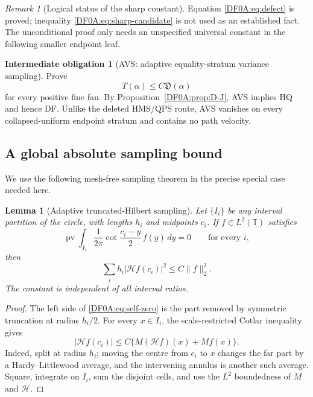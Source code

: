 \documentclass[11pt]{amsart}
\numberwithin{equation}{section}
\newtheorem{lemma}[theorem]{Lemma}
\theoremstyle{definition}
\newtheorem{obligation}[theorem]{Intermediate obligation}
\theoremstyle{remark}
\newtheorem{remark}[theorem]{Remark}
\newcommand{\T}{\mathbb T}
\newcommand{\Hil}{\mathcal H}
\begin{document}
\begin{remark}[Logical status of the sharp constant]
Equation \eqref{DF0A:eq:defect} is proved; inequality
\eqref{DF0A:eq:sharp-candidate} is not used as an established fact.  The
unconditional proof only needs an unspecified universal constant in the
following smaller endpoint leaf.
\end{remark}

\begin{obligation}[AVS: adaptive equality-stratum variance sampling]
\label{DF0A:obl:AVS}
Prove
\begin{equation}\label{DF0A:eq:AVS}
 \boxed{T(\alpha)\le C\mathfrak D(\alpha)}
\end{equation}
for every positive fine fan.  By Proposition~\ref{DF0A:prop:D-J}, AVS implies
HQ and hence DF.  Unlike the deleted HMS/QPS route, AVS vanishes on every
collapsed-uniform endpoint stratum and contains no path velocity.
\end{obligation}

\subsection{A global absolute sampling bound}

We use the following mesh-free sampling theorem in the precise special
case needed here.

\begin{lemma}[Adaptive truncated-Hilbert sampling]
\label{DF0A:lem:sampling}
Let $\{I_i\}$ be any interval partition of the circle, with lengths
$h_i$ and midpoints $c_i$.  If $f\in L^2(\T)$ satisfies
\begin{equation}\label{DF0A:eq:self-zero}
 \operatorname {pv}\int_{I_i}\frac1{2\pi}
 \cot\frac{c_i-y}{2}\,f(y)\,dy=0
 \qquad\text{for every }i,
\end{equation}
then
\begin{equation}\label{DF0A:eq:sampling}
 \sum_i h_i|\Hil f(c_i)|^2\le C\|f\|_2^2.
\end{equation}
The constant is independent of all interval ratios.
\end{lemma}

\begin{proof}
The left side of \eqref{DF0A:eq:self-zero} is the part removed by symmetric
truncation at radius $h_i/2$.  For every $x\in I_i$, the
scale-restricted Cotlar inequality gives
\[
 |\Hil f(c_i)|\le C\{M(\Hil f)(x)+Mf(x)\}.
\]
Indeed, split at radius $h_i$; moving the centre from $c_i$ to $x$
changes the far part by a Hardy--Littlewood average, and the intervening
annulus is another such average.  Square, integrate on $I_i$, sum the
disjoint cells, and use the $L^2$ boundedness of $M$ and $\Hil$.
\end{proof}
\end{document}
